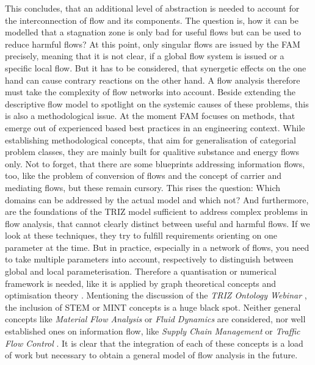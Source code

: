 \documentclass[a4paper,11pt]{article}
\begin{document}
This concludes, that an additional level of abstraction is needed to account
for the interconnection of flow and its components. The question is, how it
can be modelled that a stagnation zone is only bad for useful flows but can be
used to reduce harmful flows? At this point, only singular flows are issued by
the FAM precisely, meaning that it is not clear, if a global flow system is
issued or a specific local flow.  But it has to be considered, that synergetic
effects on the one hand can cause contrary reactions on the other hand. A flow
analysis therefore must take the complexity of flow networks into account.
Beside extending the descriptive flow model to spotlight on the systemic
causes of these problems, this is also a methodological issue. At the moment
FAM focuses on methods, that emerge out of experienced based best practices in
an engineering context. While establishing methodological concepts, that aim
for generalisation of categorial problem classes, they are mainly built for
qualitive substance and energy flows only. Not to forget, that there are some
blueprints addressing information flows, too, like the problem of conversion
of flows and the concept of carrier and mediating flows, but these remain
cursory. This rises the question: Which domains can be addressed by the actual
model and which not? And furthermore, are the foundations of the TRIZ model
sufficient to address complex problems in flow analysis, that cannot clearly
distinct between useful and harmful flows. If we look at these techniques,
they try to fulfill requirements orienting on one parameter at the time. But
in practice, especially in a network of flows, you need to take multiple
parameters into account, respectively to distinguish between global and local
parameterisation.  Therefore a quantisation or numerical framework is needed,
like it is applied by graph theoretical concepts and optimisation theory
\cite{FN}.  Mentioning the discussion of the \emph{TRIZ Ontology Webinar}
\cite{TOW}, the inclusion of STEM or MINT concepts is a huge black spot.
Neither general concepts like \emph{Material Flow Analysis} \cite{MFA} or
\emph{Fluid Dynamics} \cite{FD} are considered, nor well established ones on
information flow, like \emph{Supply Chain Management} or \emph{Traffic Flow
  Control} \cite{TF}. It is clear that the integration of each of these
concepts is a load of work but necessary to obtain a general model of flow
analysis in the future.
\end{document}
